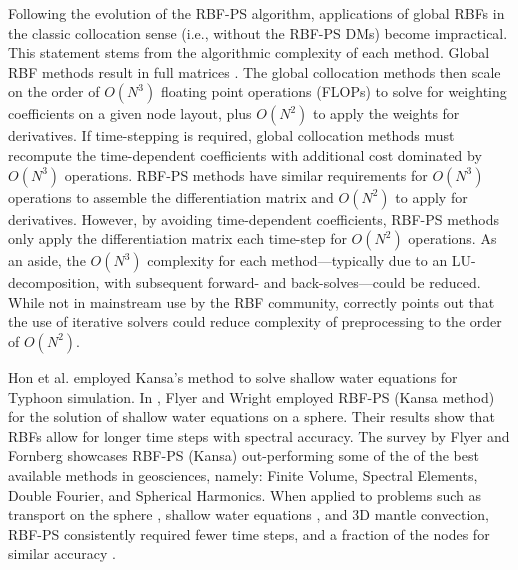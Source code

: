 \documentclass[11pt]{report}
\begin{document}
{Following the evolution of the RBF-PS algorithm, applications of global RBFs in the classic collocation sense (i.e., without the RBF-PS DMs) become impractical. This statement stems from the algorithmic complexity of each method. 
Global RBF methods result in full matrices \cite{Fasshauer2007}. The global collocation methods then scale on the order of $O(N^3)$ floating point operations (FLOPs) to solve for weighting coefficients on a given node layout, plus $O(N^2)$ to apply the weights for derivatives. If time-stepping is required, global collocation methods must recompute the time-dependent coefficients with additional cost dominated by $O(N^3)$ operations. RBF-PS methods have similar requirements for $O(N^3)$ operations to assemble the differentiation matrix and $O(N^2)$ to apply for derivatives. However, by avoiding time-dependent coefficients, RBF-PS methods only apply the differentiation matrix each time-step for $O(N^2)$ operations. As an aside, the $O(N^3)$ complexity for each method---typically due to an LU-decomposition, with subsequent forward- and back-solves---could be reduced. While not in mainstream use by the RBF community, \cite{Morse2005} correctly points out that the use of iterative solvers could reduce complexity of preprocessing to the order of $O(N^2)$. 

Hon et al. \cite{Hon1999} employed Kansa's method to solve shallow water equations for Typhoon simulation.
In \cite{FlyerWright09}, Flyer and Wright employed RBF-PS (Kansa method) for the solution of shallow water equations on a sphere. Their 
results show that RBFs allow for longer time steps with spectral accuracy. The survey \cite{FlyerFornberg11} by Flyer and Fornberg showcases RBF-PS (Kansa) out-performing some of the of the best available methods in geosciences, namely: Finite Volume, Spectral Elements, Double Fourier, and Spherical Harmonics. When applied to problems such as transport on the sphere \cite{FlyerWright07}, shallow water equations \cite{FlyerWright09}, and 3D mantle convection\cite{WrightFlyerYuen10}, RBF-PS consistently required fewer time steps, and a fraction of the nodes for similar accuracy \cite{FlyerFornberg11}. 

%

}
\end{document}

